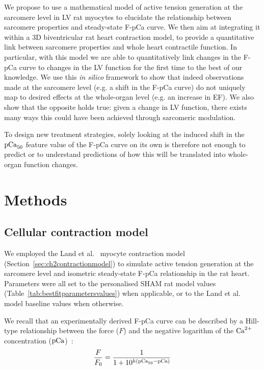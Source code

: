 \vspace{0.2cm}
We propose to use a mathematical model of active tension generation at the sarcomere level in LV rat myocytes to elucidate the relationship between sarcomere properties and steady-state F-pCa curve. We then aim at integrating it within a $3$D biventricular rat heart contraction model, to provide a quantitative link between sarcomere properties and whole heart contractile function. In particular, with this model we are able to quantitatively link changes in the F-pCa curve to changes in the LV function for the first time to the best of our knowledge. We use this \textit{in silico} framework to show that indeed observations made at the sarcomere level (e.g. a shift in the F-pCa curve) do not uniquely map to desired effects at the whole-organ level (e.g. an increase in EF). We also show that the opposite holds true: given a change in LV function, there exists many ways this could have been achieved through sarcomeric modulation.

\vspace{0.2cm}
To design new treatment strategies, solely looking at the induced shift in the $\textrm{pCa}_{50}$ feature value of the F-pCa curve on its own is therefore not enough to predict or to understand predictions of how this will be translated into whole-organ function changes.


%
%
%
\section{Methods}\label{sec:ch8methods}


%
%
%
\subsection{Cellular contraction model}\label{sec:cellcontr}
We employed the Land et al.~\cite{Land:2012} myocyte contraction model (Section~\ref{sec:ch2contractionmodel}) to simulate active tension generation at the sarcomere level and isometric steady-state F-pCa relationship in the rat heart. Parameters were all set to the personalised SHAM rat model values (Table~\ref{tab:bestfitparametersvalues}) when applicable, or to the Land et al.~\cite{Land:2012} model baseline values when otherwise.

\vspace{0.2cm}
We recall that an experimentally derived F-pCa curve can be described by a Hill-type relationship between the force ($F$) and the negative logarithm of the $\textrm{Ca}^{2+}$ concentration ($\textrm{pCa}$)~\cite{Walker:2010}:
%
\begin{equation}
    \frac{F}{F_0} = \frac{1}{1+10^{h(\textrm{pCa}_{50}-\textrm{pCa})}}
\end{equation}


